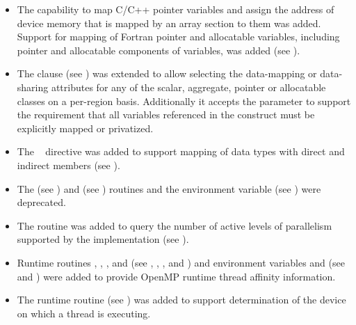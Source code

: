 \begin{itemize}
\item The capability to map C/C++ pointer variables and assign the
      address of device memory that is mapped by an array section to them
      was added.
      Support for mapping of Fortran pointer and allocatable
      variables, including pointer and allocatable components of variables, 
      was added (see ).

\item The  clause (see )
      was extended to allow selecting the data-mapping or data-sharing attributes for
      any of the scalar, aggregate, pointer or allocatable classes on a
      per-region basis. Additionally it accepts the  parameter to support the
      requirement that all variables referenced in the
      construct must be explicitly mapped or privatized.

\item The ~ directive was added to support
      mapping of data types with direct and indirect members (see
      ).

\item The  (see ) and
       (see ) routines and
      the  environment variable (see
      ) were deprecated.

\item The  routine was added to query the
      number of active levels of parallelism supported by the
      implementation (see ).

\item Runtime routines , ,
      , and 
      (see ,
      , ,
      and ) and environment variables
       and  (see
       and )
      were added to provide OpenMP runtime thread affinity information.

\item The  runtime routine
      (see ) was added to support
      determination of the device on which a thread is executing.


\end{itemize}
